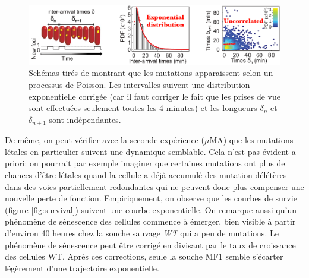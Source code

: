 \documentclass[12pt]{article}
\begin{document}
\begin{figure}[h]
  \begin{center}
    \vspace{3mm}
    \includegraphics[scale=0.45]{../Img/Interarrival_times.png}
  \end{center}  
  \caption{\label{fig:iatime}Schémas tirés de \cite{rob} montrant que les mutations apparaissent selon un processus de Poisson. Les intervalles suivent une distribution exponentielle corrigée (car il faut corriger le fait que les prises de vue sont effectuées seulement toutes les 4 minutes) et les longueurs $\delta_n$ et $\delta_{n+1}$ sont indépendantes.}
\end{figure}
\FloatBarrier

De même, on peut vérifier avec la seconde expérience ($\mu$MA) que les mutations létales en particulier suivent une dynamique semblable. Cela n'est pas évident a priori: on pourrait par exemple imaginer que certaines mutations ont plus de chances d'être létales quand la cellule a déjà accumulé des mutation délétères dans des voies partiellement redondantes qui ne peuvent donc plus compenser une nouvelle perte de fonction. Empiriquement, on observe que les courbes de survie (figure \ref{fig:survival}) suivent une courbe exponentielle. On remarque aussi qu'un phénomène de sénescence des cellules commence à émerger, bien visible à partir d'environ 40 heures chez la souche sauvage \emph{WT} qui a peu de mutations. Le phénomène de sénescence peut être corrigé en divisant par le taux de croissance des cellules WT. Après ces corrections, seule la souche MF1 semble s'écarter légèrement d'une trajectoire exponentielle.
\end{document}
